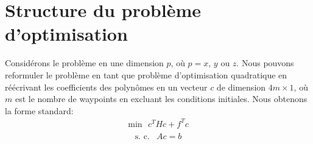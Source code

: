 \section{Structure du problème d'optimisation}

Considérons le problème en une dimension $p$, où $p = x$, $y$ ou $z$. Nous pouvons reformuler le problème en tant que problème d'optimisation quadratique en réécrivant les coefficients des polynômes en un vecteur $c$ de dimension $4m \times 1$, où $m$ est le nombre de waypoints en excluant les conditions initiales. Nous obtenons la forme standard:
\begin{align}\label{eq:opt_quad}
\text{min}\ \ \ c^THc+f^Tc
\end{align}\begin{align*}
	\begin{array}{ll}
	\text{s. c.} & Ac = b
	\end{array}
\end{align*}

